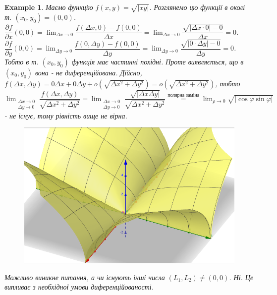 \documentclass[a4paper, 10pt]{article}
\def\departial#1#2{\dfrac{\partial {#1}}{\partial {#2}}}
\def\huge{\displaystyle}
\theoremstyle{theoremdd}
\theoremstyle{theoremdd}
\theoremstyle{theoremdd}
\theoremstyle{theoremdd}
\theoremstyle{theoremdd}
\newtheorem{example}[theorem]{Example}
\theoremstyle{theoremdd}
\theoremstyle{theoremdd}
\theoremstyle{theoremdd}
\theoremstyle{theoremdd}
\begin{document}
\begin{example}
Маємо функцію $f(x,y) = \sqrt{|xy|}$. Розглянемо цю функції в околі т. $(x_0,y_0) = (0,0)$.\\
$\departial{f}{x}(0,0) = \huge\lim_{\Delta x \to 0} \dfrac{f(\Delta x,0) - f(0,0)}{\Delta x} = \lim_{\Delta x \to 0} \dfrac{\sqrt{|\Delta x \cdot 0| - 0}}{\Delta x} = 0$.\\
$\departial{f}{y}(0,0) = \huge\lim_{\Delta y \to 0} \dfrac{f(0,\Delta y) - f(0,0)}{\Delta y} = \lim_{\Delta y \to 0} \dfrac{\sqrt{|0 \cdot \Delta y| - 0}}{\Delta y} = 0$.\\
Тобто в т. $(x_0,y_0)$ функція має частинні похідні. Проте виявляється, що в $(x_0,y_0)$ вона - не диференційована. Дійсно,\\
$f(\Delta x,\Delta y) = 0 \Delta x + 0 \Delta y + o(\sqrt{\Delta x^2 + \Delta y^2}) = o(\sqrt{\Delta x^2 + \Delta y^2})$, тобто\\
$\huge\lim_{\substack{\Delta x \to 0 \\ \Delta y \to 0}} \dfrac{f(\Delta x,\Delta y)}{\sqrt{\Delta x^2 + \Delta y^2}} = \lim_{\substack{\Delta x \to 0 \\ \Delta y \to 0}} \dfrac{\sqrt{|\Delta x \Delta y|}}{\sqrt{\Delta x^2 + \Delta y^2}} \overset{\text{полярна заміна}}{=} \lim_{\rho \to 0} \sqrt{|\cos \varphi \sin \varphi|}$ - не існує, тому рівність вище не вірна.
\begin{figure}[H]
\centering
\includegraphics[scale=0.24]{not_differentiable.png}
\end{figure}
Можливо виникне питання, а чи існують інші числа $(L_1,L_2) \neq (0,0)$. Ні. Це випливає з необхідної умови диференційованості.
\end{example}
\end{document}
